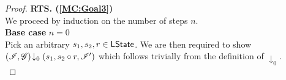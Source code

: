 \begin{lemma}
\begin{proof}
\noindent\textbf{RTS. (\ref{MC:Goal3})} \\
We proceed by induction on the number of steps $n$.\\

\noindent\textbf{Base case }$n=0$\\
Pick an arbitrary $s_1, s_2, r \in \textsf{LState}$. We are then required to show	$\left(\mathscr{I}, \mathscr{G}\right) \!\downarrow_{0} \left(s_1, s_2 \circ r, \mathscr{I}'\right) $ which follows trivially from the definition of $\downarrow_0$.\\


\end{proof}
\end{lemma}
